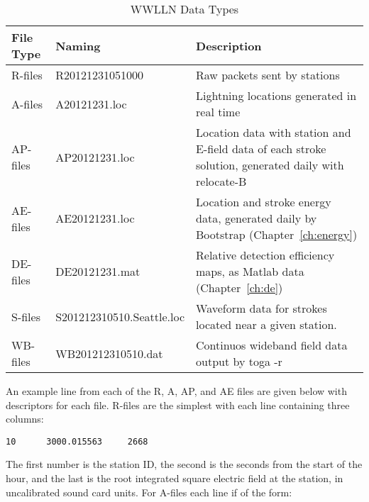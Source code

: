 \begin{table}[h!]
\begin{center}
\caption{WWLLN Data Types}
\begin{tabular}{|p{.75in}|p{2in}|p{4in}|}

\hline
{\bf File Type} & {\bf Naming} &	{\bf Description} \\

\hline
\rule{0pt}{3ex}
R-files	& R20121231051000	&	Raw packets sent by stations\\ 

\hline
\rule{0pt}{3ex}
A-files	& A20121231.loc	&	Lightning locations generated in real time\\ 

\hline
\rule{0pt}{3ex}
AP-files	& AP20121231.loc	&	Location data with station and E-field data of each stroke solution, generated daily with relocate-B\\ 

\hline
\rule{0pt}{3ex}
AE-files	& AE20121231.loc	&	Location and stroke energy data, generated daily by Bootstrap (Chapter~\ref{ch:energy})\\ 

\hline
\rule{0pt}{3ex}
DE-files	& DE20121231.mat	&	Relative detection efficiency maps, as Matlab data (Chapter~\ref{ch:de})\\ 

\hline
\rule{0pt}{3ex}
S-files	& S201212310510.Seattle.loc	&	Waveform data for strokes located near a given station.\\ 

\hline
\rule{0pt}{3ex}
WB-files	& WB201212310510.dat	&	Continuos wideband field data output by toga -r\\ 

\hline
\end{tabular}
\end{center}
\label{code:fileType}
\end{table}
 
An example line from each of the R, A, AP, and AE files are given below with descriptors for each file.
R-files are the simplest with each line containing three columns:

\begin{verbatim}
10      3000.015563     2668
\end{verbatim}

The first number is the station ID, the second is the seconds from the start of the hour, and the last is the root integrated square electric field at the station, in uncalibrated sound card units.
For A-files each line if of the form:


